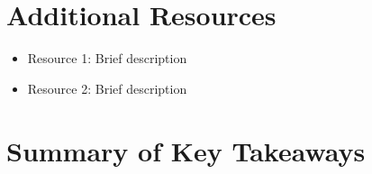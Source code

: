 \documentclass[11pt,a4paper]{article}
\begin{document}
\section{Additional Resources}
\begin{itemize}
    \item Resource 1: Brief description
    \item Resource 2: Brief description
\end{itemize}

\section{Summary of Key Takeaways}
\end{document}
